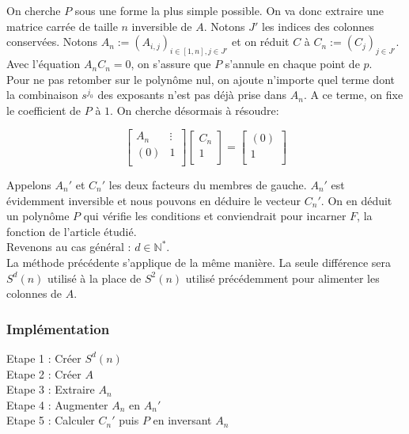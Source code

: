 \documentclass{article}
\begin{document}
	On cherche $P$ sous une forme la plus simple possible. On va donc extraire une matrice carrée de taille $n$ inversible de $A$. Notons $J'$ les indices des colonnes conservées. Notons $A_n:=(A_{i,j})_{i\in[1,n],j\in J'}$ et on réduit $C$ à $C_n:=(C_{j})_{j\in J'}$. Avec l'équation $A_n C_n = 0$, on s'assure que $P$ s'annule en chaque point de $p$.\\
	Pour ne pas retomber sur le polynôme nul, on ajoute n'importe quel terme dont la combinaison $s^{j_0}$ des exposants n'est pas déjà prise dans $A_n$. A ce terme, on fixe le coefficient de $P$ à $1$. On cherche désormais à résoudre:
	
	\begin{equation}
		\begin{bmatrix}
			A_n & \vdots \\
			(0)   & 1 \\
		\end{bmatrix} 
		\begin{bmatrix}
			C_n\\
			1\\
		\end{bmatrix} = \begin{bmatrix}
			(0)\\
			1\\
		\end{bmatrix}
	\end{equation}
	
	Appelons $A_n'$ et $C_n'$ les deux facteurs du membres de gauche. $A_n'$ est évidemment inversible et nous pouvons en déduire le vecteur $C_n'$. 
	On en déduit un polynôme $P$ qui vérifie les conditions et conviendrait pour incarner $F$, la fonction de l'article étudié.\\
	
	
	Revenons au cas général : $d\in\mathbb{N}^*$.\\
	La méthode précédente s'applique de la même manière. La seule différence sera $S^d(n)$ utilisé à la place de $S^2(n)$ utilisé précédemment pour alimenter les colonnes de $A$.

	\subsubsection{Implémentation}
	Etape 1 : Créer $S^d(n)$\\
	Etape 2 : Créer $A$\\
	Etape 3 : Extraire $A_n$\\
	Etape 4 : Augmenter $A_n$ en $A_n'$\\
	Etape 5 : Calculer $C_n'$ puis $P$ en inversant $A_n$\\
\end{document}
